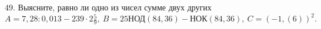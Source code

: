 49. Выясните, равно ли одно из чисел сумме двух других\\
$A=7,28:0,013-239\cdot2\frac{5}{9},\ B=25\text{НОД}(84, 36)-\text{НОК}(84,36),\ C=(-1,(6))^2.$\\

